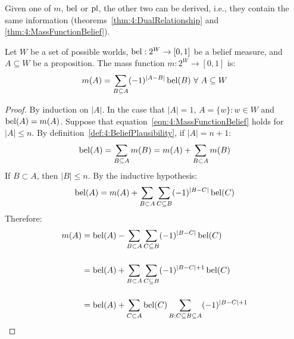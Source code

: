 Given one of $m$, $\operatorname*{bel}$ or $\operatorname*{pl}$, the other two can be derived, i.e., they
contain the same information (theorems~\ref{thm:4:DualRelationship} and
\ref{thm:4:MassFunctionBelief}).

\begin{thm}
  \label{thm:4:MassFunctionBelief}
  Let $W$ be a set of possible worlds,
  $\operatorname*{bel} : 2^W \to [0, 1]$ be a belief measure, and
  $A \subseteq W$ be a proposition.
  The mass function $m : 2^W \to [0, 1]$ is:
  \begin{equation}
    \label{eqn:4:MassFunctionBelief}
    m(A) = \sum_{B \subseteq A} (-1)^{|A - B|} \operatorname*{bel}(B)
    \ \forall\
    A \subseteq W
  \end{equation}

  \begin{proof}
    By induction on $|A|$.
    In the case that $|A| = 1$, $A = \{w\} : w \in W$ and $\operatorname*{bel}(A) = m(A)$.
    Suppose that equation~\ref{eqn:4:MassFunctionBelief} holds for $|A| \leq n$.
    By definition~\ref{def:4:BeliefPlausibility}, if $|A| = n + 1$:
    \begin{equation*}
      \operatorname*{bel}(A) = \sum_{B \subseteq A} m(B) = m(A) + \sum_{B \subset A} m(B)
    \end{equation*}
    If $B \subset A$, then $|B| \leq n$.
    By the inductive hypothesis:
    \begin{equation*}
      \operatorname*{bel}(A) = m(A) + \sum_{B \subset A} \sum_{C \subseteq B} (-1)^{|B - C|} \operatorname*{bel}(C)
    \end{equation*}
    Therefore:
    \begin{align}
      \label{eqn:4:MassFunctionBelief1}
      m(A)
       & =
      \operatorname*{bel}(A) -
      \sum_{B \subset A} \sum_{C \subseteq B} (-1)^{|B - C|} \operatorname*{bel}(C)
      \nonumber \\[3ex]
       & =
      \operatorname*{bel}(A) +
      \sum_{B \subset A} \sum_{C \subseteq B} (-1)^{|B - C| + 1} \operatorname*{bel}(C)
      \nonumber \\[3ex]
       & =
      \operatorname*{bel}(A) +
      \sum_{C \subset A} \operatorname*{bel}(C) \sum_{B : C \subseteq B \subseteq A} (-1)^{|B - C| + 1}
    \end{align}


\end{proof}
\end{thm}
